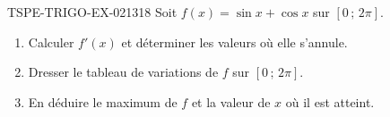 \begin{exercice}{TSPE-TRIGO-EX-021}{3}{18}
Soit $f(x)=\sin x+\cos x$ sur $[0\,;\,2\pi]$.
\begin{enumerate}
  \item Calculer $f'(x)$ et déterminer les valeurs où elle s'annule.
  \item Dresser le tableau de variations de $f$ sur $[0\,;\,2\pi]$.
  \item En déduire le maximum de $f$ et la valeur de $x$ où il est atteint.
\end{enumerate}
\end{exercice}
